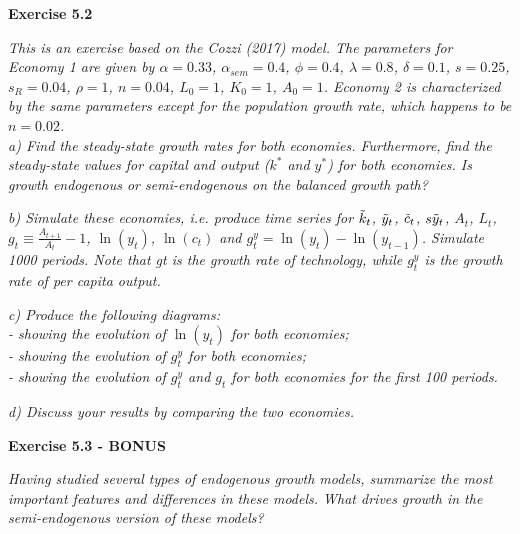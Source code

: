\documentclass[11pt]{article} %
\begin{document}
\pagebreak
\textbf{\Large{Exercise 5.2}}

\textit{This is an exercise based on the Cozzi (2017) model. The parameters for Economy 1 are given by $\alpha = 0.33$, $\alpha_{sem} = 0.4$, $\phi = 0.4$, $\lambda = 0.8$, $\delta=0.1$, $s=0.25$, $s_R =0.04$, $\rho=1$, $n = 0.04$, $L_0 = 1$, $K_0 = 1$, $A_0 = 1$. Economy 2 is characterized by the same parameters except for the population growth rate, which happens to be $n = 0.02$.}\\

\textit{a) Find the steady-state growth rates for both economies. Furthermore, find the steady-state values for capital and output ($k^*$ and $y^*$) for both economies. Is growth endogenous or semi-endogenous on the balanced growth path?}




\pagebreak
\textit{b) Simulate these economies, i.e. produce time series for $\Tilde{k}_t$, $\Tilde{y}_t$, $\Tilde{c}_t$, $s\Tilde{y}_t$, $A_t$, $L_t$, $g_t \equiv \frac{A_{t+1}}{A_t} - 1$, $\ln(y_t)$, $\ln(c_t)$ and $g_t^y = \ln(y_t) - \ln(y_{t-1})$. Simulate 1000 periods. Note that gt is the growth rate of technology, while $g_t^y$ is the growth rate of per capita output.}





\pagebreak
\textit{c) Produce the following diagrams:\\
- showing the evolution of $\ln(y_t)$ for both economies;\\
- showing the evolution of $g_t^y$ for both economies;\\
- showing the evolution of $g_t^y$ and $g_t$ for both economies for the first 100 periods.}




\pagebreak
\textit{d) Discuss your results by comparing the two economies.}




\pagebreak
\textbf{\Large{Exercise 5.3 - BONUS}}

\textit{Having studied several types of endogenous growth models, summarize the most important features and differences in these models. What drives growth in the semi-endogenous version of these models?}
\end{document}
